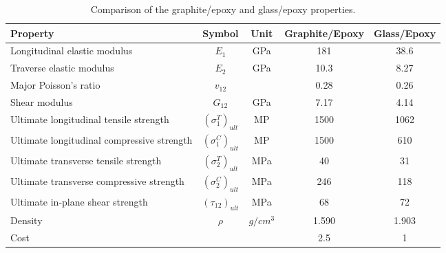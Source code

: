 \begin{table}[!h]
\caption{Comparison of the graphite/epoxy and glass/epoxy properties.}
\centering
\begin{adjustbox}{width=0.5\textwidth}
\label{tab:mat}
\begin{tabular}{lcccc}
\toprule
Property								   & Symbol				  & Unit  &  Graphite/Epoxy  &  Glass/Epoxy   \\
\midrule
Longitudinal elastic modulus			   & $E_1$				  & GPa   &  181             &  38.6           \\
Traverse elastic modulus				   & $E_2$				  & GPa   &  10.3            &  8.27           \\
Major Poisson's ratio					   & $v_{12}$			  &       &  0.28            &  0.26           \\
Shear modulus							   & $G_{12}$			  & GPa   &  7.17            &  4.14           \\
Ultimate longitudinal tensile strength     & $(\sigma_1^T)_{ult}$ & MP    &  1500            &  1062            \\
Ultimate longitudinal compressive strength & $(\sigma_1^C)_{ult}$ & MP    &  1500            &  610             \\
Ultimate transverse tensile strength       & $(\sigma_2^T)_{ult}$ & MPa   &  40              &  31              \\
Ultimate transverse compressive strength   & $(\sigma_2^C)_{ult}$ & MPa   &  246             &  118              \\
Ultimate in-plane shear strength           & $(\tau_{12})_{ult}$  & MPa   &  68              &  72               \\
Density                                    & $\rho$               & $g/cm^3$  &  1.590           &  1.903               \\
Cost                                       &                      &           &  2.5             &  1               \\
\bottomrule
\end{tabular}
\end{adjustbox}
\end{table}

